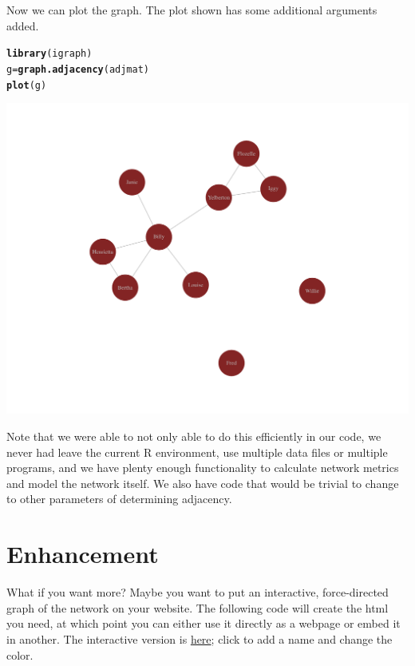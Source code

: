 \documentclass[english,nohyper,titlepage]{tufte-handout}\usepackage[]{graphicx}\usepackage[]{color}
\makeatletter
\newcommand{\hlstd}[1]{\textcolor[rgb]{0.345,0.345,0.345}{#1}}%
\newcommand{\hlkwb}[1]{\textcolor[rgb]{0.69,0.353,0.396}{#1}}%
\newcommand{\hlkwd}[1]{\textcolor[rgb]{0.737,0.353,0.396}{\textbf{#1}}}%
\newenvironment{kframe}{%
 \def\at@end@of@kframe{}%
 \ifinner\ifhmode%
  \def\at@end@of@kframe{\end{minipage}}%
  \begin{minipage}{\columnwidth}%
 \fi\fi%
 \def\FrameCommand##1{\hskip\@totalleftmargin \hskip-\fboxsep
 \colorbox{shadecolor}{##1}\hskip-\fboxsep
     \hskip-\linewidth \hskip-\@totalleftmargin \hskip\columnwidth}%
 \MakeFramed {\advance\hsize-\width
   \@totalleftmargin\z@ \linewidth\hsize
   \@setminipage}}%
 {\par\unskip\endMakeFramed%
 \at@end@of@kframe}
\newenvironment{knitrout}{}{} %
\makeatother
\begin{document}
\noindent Now we can plot the graph.  The plot shown has some additional arguments added.


\begin{knitrout}\footnotesize
{}\color{fgcolor}\begin{kframe}
\begin{alltt}
\hlkwd{library}\hlstd{(igraph)}
\hlstd{g} \hlkwb{=} \hlkwd{graph.adjacency}\hlstd{(adjmat)}
\hlkwd{plot}\hlstd{(g)}
\end{alltt}
\end{kframe}
\end{knitrout}
\includegraphics[scale=.38]{networkgraph}


Note that we were able to not only able to do this efficiently in our code, we never had leave the current R environment, use multiple data files or multiple programs, and we have plenty enough functionality to calculate network metrics and model the network itself.  We also have code that would be trivial to change to other parameters of determining adjacency.

\section{Enhancement}
What if you want more?  Maybe you want to put an interactive, force-directed graph of the network on your website.  The following code will create the html you need, at which point you can either use it directly as a webpage or embed it in another.  The interactive version is \href{http://www3.nd.edu/~mclark19/misc/demos/network.html}{here}; click to add a name and change the color.
\end{document}
